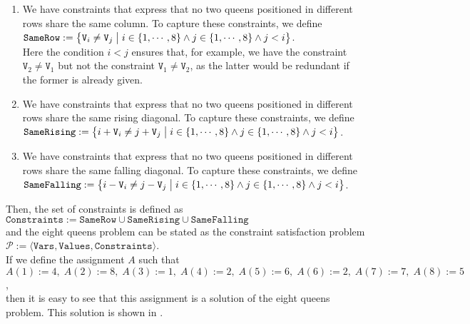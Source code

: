 \begin{enumerate}
\item We have constraints that express that no two queens positioned in different rows share the same column.
      To capture these constraints, we define
      \\[0.2cm]
      \hspace*{1.3cm}
      $\mathtt{SameRow} := \bigl\{ \mathtt{V}_i \not= \mathtt{V}_j \bigm| i \in \{1,\cdots,8\} \wedge j \in \{1,\cdots,8\} \wedge j < i \bigr\}$.
      \\[0.2cm]
      Here the condition $i < j$ ensures that, for example, we have the constraint $\mathtt{V}_2 \not= \mathtt{V}_1$
      but not the constraint  $\mathtt{V}_1 \not= \mathtt{V}_2$, as the latter would be redundant if the former is
      already given.
\item We have constraints that express that no two queens positioned in different rows share the same rising
      diagonal.  To capture these constraints, we define
      \\[0.2cm]
      \hspace*{1.3cm}
      $\mathtt{SameRising} := \bigl\{ i + \mathtt{V}_i \not= j + \mathtt{V}_j \bigm| i \in \{1,\cdots,8\} \wedge j \in \{1,\cdots,8\} \wedge j < i \bigr\}$.
\item We have constraints that express that no two queens positioned in different rows share the same falling
      diagonal.  To capture these constraints, we define
      \\[0.2cm]
      \hspace*{1.3cm}
      $\mathtt{SameFalling} := \bigl\{ i - \mathtt{V}_i \not= j - \mathtt{V}_j \bigm| i \in \{1,\cdots,8\} \wedge j \in \{1,\cdots,8\} \wedge j < i \bigr\}$.
\end{enumerate}
Then, the set of constraints is defined as 
\\[0.2cm]
\hspace*{1.3cm}
$\mathtt{Constraints} := \mathtt{SameRow} \cup \mathtt{SameRising} \cup \mathtt{SameFalling}$
\\[0.2cm]
and the eight queens problem can be stated as the constraint satisfaction problem
\\[0.2cm]
\hspace*{1.3cm}
$\mathcal{P} := \langle \mathtt{Vars}, \mathtt{Values}, \mathtt{Constraints} \rangle$.
\\[0.2cm]
If we define the assignment $A$ such that
\\[0.2cm]
\hspace*{1.3cm}
$A(1) := 4,\; A(2) := 8,\; A(3) := 1,\; A(4) := 2,\; A(5) := 6,\; A(6) := 2,\; A(7) := 7,\; A(8) := 5$,
\\[0.2cm]
then it is easy to see that this assignment is a solution of the eight queens problem.  This solution is shown
in .


